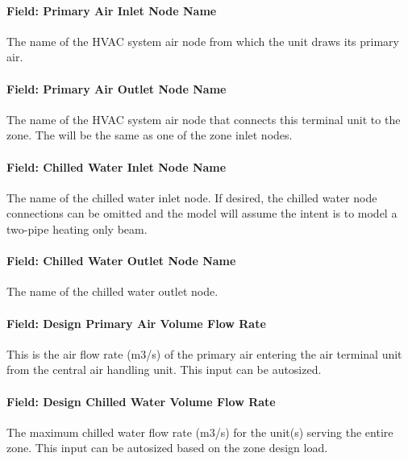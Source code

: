 \paragraph{Field: Primary Air Inlet Node Name}\label{field-primary-air-inlet-node-name}

The name of the HVAC system air node from which the unit draws its primary air.

\paragraph{Field: Primary Air Outlet Node Name}\label{field-primary-air-outlet-node-name}

The name of the HVAC system air node that connects this terminal unit to the zone. The will be the same as one of the zone inlet nodes.

\paragraph{Field: Chilled Water Inlet Node Name}\label{field-chilled-water-inlet-node-name}

The name of the chilled water inlet node. If desired, the chilled water node connections can be omitted and the model will assume the intent is to model a two-pipe heating only beam.

\paragraph{Field: Chilled Water Outlet Node Name}\label{field-chilled-water-outlet-node-name}

The name of the chilled water outlet node.

\paragraph{Field: Design Primary Air Volume Flow Rate}\label{field-design-primary-air-volume-flow-rate}

This is the air flow rate (m3/s) of the primary air entering the air terminal unit from the central air handling unit. This input can be autosized.

\paragraph{Field: Design Chilled Water Volume Flow Rate}\label{field-design-chilled-water-volume-flow-rate}

The maximum chilled water flow rate (m3/s) for the unit(s) serving the entire zone. This input can be autosized based on the zone design load.

